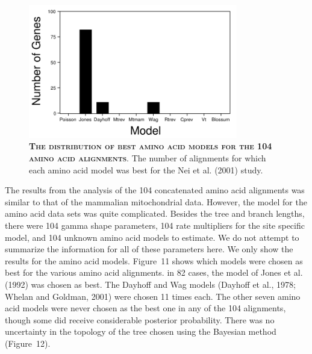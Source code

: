 \documentclass{svmult}
\begin{document}
\begin{figure}[t]
\centering
\includegraphics[height=2.3in]{fig11}
\caption{\textbf{\textsc{The distribution of best amino acid models for the 104 amino acid alignments}}.
The number of alignments  for which each amino acid model was best for the Nei et al. (2001) study.}
\label{fig11}
\end{figure}
The results from the analysis of the 104 concatenated amino acid alignments was similar to that of the mammalian mitochondrial data. However, the model for the amino acid
data sets was quite complicated. Besides the tree and branch lengths, there were 104 gamma shape parameters, 104 rate multipliers for the site specific model, and 104 unknown
amino acid models to estimate. We do not attempt to summarize the information for all of these parameters here. We only show the results for the amino acid models. Figure~11
shows which models were chosen as best for the various amino acid alignments. in 82 cases, the model of Jones et al. (1992) was chosen as best. The Dayhoff and Wag models
(Dayhoff et al., 1978; Whelan and Goldman, 2001) were chosen 11 times each. The other seven amino acid models were never chosen as the best one in any of the
104 alignments, though some did receive considerable posterior probability. There was no uncertainty in the topology of the tree chosen using the Bayesian method (Figure~12).
\end{document}
